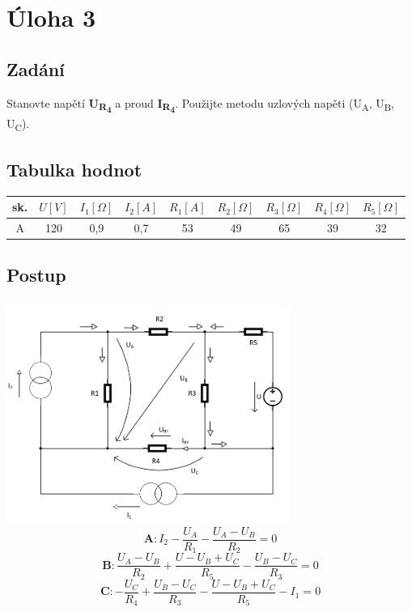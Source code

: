 \documentclass[a4paper,12pt]{article}
\begin{document}
\section{Úloha 3} %
	\subsection{Zadání}
		Stanovte napětí \textbf{U\textsubscript{R\textsubscript{4}}} a proud \textbf{I\textsubscript{R\textsubscript{4}}}. Použijte metodu uzlových napěti (U\textsubscript{A}, U\textsubscript{B}, U\textsubscript{C}).
	\subsection{Tabulka hodnot}
		\begin{table}[htbp]
			\centering
			\begin{tabular}{*{9}{c}}
				\toprule
				sk. & \(U [V]\) & \(I_1 [\Omega]\) & \(I_2 [A]\) & \(R_1 [A]\) & \(R_2 [\Omega]\) & \(R_3 [\Omega]\) & \(R_4 [\Omega]\) & \(R_5 [\Omega]\) \\
				\midrule
				A & 120 & 0,9 & 0,7 & 53 & 49 & 65 & 39 & 32 \\
				\bottomrule
			\end{tabular}
		\end{table}
	\subsection{Postup}
		\subsubsection{} %
			\includegraphics[width=350px]{3_1.png}
			\begin{equation}
				\mathbf{A}: I_2 - \frac{U_A}{R_1} - \frac{U_A - U_B}{R_2} = 0 \nonumber
			\end{equation}
			\begin{equation}
				\mathbf{B}: \frac{U_A - U_B}{R_2} + \frac{U - U_B + U_C}{R_5} - \frac{U_B - U_C}{R_3} = 0 \nonumber
			\end{equation}
			\begin{equation}
				\mathbf{C}: -\frac{U_C}{R_4} + \frac{U_B - U_C}{R_3} - \frac{U - U_B + U_C}{R_5} -I_1  = 0 \nonumber
			\end{equation}
\end{document}
